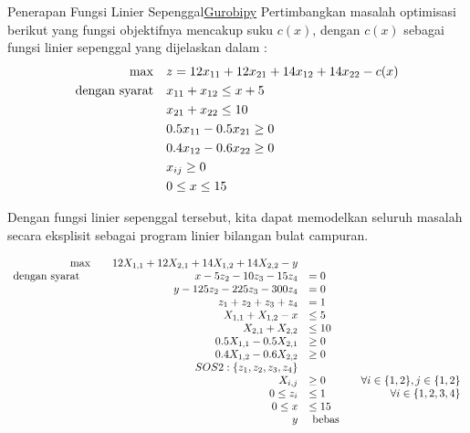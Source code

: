 \begin{examplewithcode}{Penerapan Fungsi Linier Sepenggal}{\href{https://github.com/open-optimization/open-optimization-or-examples/blob/master/nonlinear-programming/Gurobi-SOS-Examples.ipynb}{Gurobipy}}
\label{example:pwl-application}
Pertimbangkan masalah optimisasi berikut yang fungsi objektifnya mencakup suku $c(x)$, dengan $c(x)$ sebagai fungsi linier sepenggal yang dijelaskan dalam :
\begin{align}
\max \quad & z = 12x_{11} + 12x_{21} + 14x_{12} + 14x_{22} - c(x) \\
\mbox{dengan syarat}\quad        & x_{11} + x_{12} \leq x + 5 \\
& x_{21} + x_{22} \leq 10 \\
& 0.5 x_{11} - 0.5x_{21} \geq 0 \\
& 0.4 x_{12} - 0.6 x_{22} \geq 0 \\
& x_{ij} \geq 0 \\
& 0 \leq x \leq 15
\end{align}

Dengan fungsi linier sepenggal tersebut, kita dapat memodelkan seluruh masalah secara eksplisit sebagai program linier bilangan bulat campuran.

 \begin{equation}
 \begin{array}{rrlr}
 \max\quad & 12 X_{1,1} + 12 X_{2,1} + 14 X_{1,2} + 14 X_{2,2} - y\\
\mbox{dengan syarat}\quad \quad & x - 5 z_{2} - 10 z_{3} - 15 z_{4} &= 0\\
 & y - 125 z_{2} - 225 z_{3} - 300 z_{4} &= 0\\
 & z_{1} + z_{2} + z_{3} + z_{4} &= 1\\
 & X_{1,1} + X_{1,2} - x &\leq 5\\
 & X_{2,1} + X_{2,2} &\leq 10\\
 & 0.5 X_{1,1} - 0.5 X_{2,1} &\geq 0\\
 & 0.4 X_{1,2} - 0.6 X_{2,2} &\geq 0\\
 & SOS2: \{z_1, z_2, z_3, z_4\}\\
 & X_{i,j} &\geq 0 &\quad\forall i \in \{1,2\}, j \in \{1,2\}\\
 & 0 \leq z_{i} &\leq 1 &\quad\forall i \in \{1,2,3,4\}\\
 & 0 \leq x &\leq 15\\
 & y & \mbox{ bebas} \\
\end{array}
\end{equation}
\end{examplewithcode}


